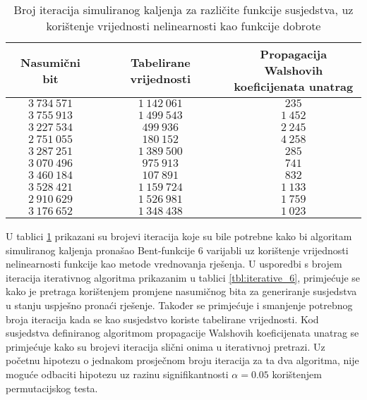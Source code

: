 \begin{table}[]
    \centering
    \begin{tabular}{ccc}
        Nasumični bit & Tabelirane vrijednosti & \makecell{Propagacija Walshovih \\ koeficijenata unatrag} \\ \hline
        $3\:734\:571$ & $1\:142\:061$ &    $235$ \\
        $3\:755\:913$ & $1\:499\:543$ & $1\:452$ \\
        $3\:227\:534$ &    $499\:936$ & $2\:245$ \\
        $2\:751\:055$ &    $180\:152$ & $4\:258$ \\
        $3\:287\:251$ & $1\:389\:500$ &    $285$ \\
        $3\:070\:496$ &    $975\:913$ &    $741$ \\
        $3\:460\:184$ &    $107\:891$ &    $832$ \\
        $3\:528\:421$ & $1\:159\:724$ & $1\:133$ \\
        $2\:910\:629$ & $1\:526\:981$ & $1\:759$ \\
        $3\:176\:652$ & $1\:348\:438$ & $1\:023$
    \end{tabular}
    \captionsetup{justification=centering}
    \caption{Broj iteracija simuliranog kaljenja za različite funkcije susjedstva, uz korištenje vrijednosti nelinearnosti kao funkcije dobrote}
    \label{tbl:simaneal_6_nonl}
\end{table}
U tablici \ref{tbl:simaneal_6_nonl} prikazani su brojevi iteracija koje su bile potrebne kako bi algoritam simuliranog kaljenja pronašao Bent-funkcije 6 varijabli uz korištenje vrijednosti nelinearnosti funkcije kao metode vrednovanja rješenja.
U usporedbi s brojem iteracija iterativnog algoritma prikazanim u tablici \ref{tbl:iterative_6}, primjećuje se kako je pretraga korištenjem promjene nasumičnog bita za generiranje susjedstva u stanju uspješno pronaći rješenje.
Također se primjećuje i smanjenje potrebnog broja iteracija kada se kao susjedstvo koriste tabelirane vrijednosti.
Kod susjedstva definiranog algoritmom propagacije Walshovih koeficijenata unatrag se primjećuje kako su brojevi iteracija slični onima u iterativnoj pretrazi.
Uz početnu hipotezu o jednakom prosječnom broju iteracija za ta dva algoritma, nije moguće odbaciti hipotezu uz razinu signifikantnosti $\alpha = 0.05$ korištenjem permutacijskog testa.

